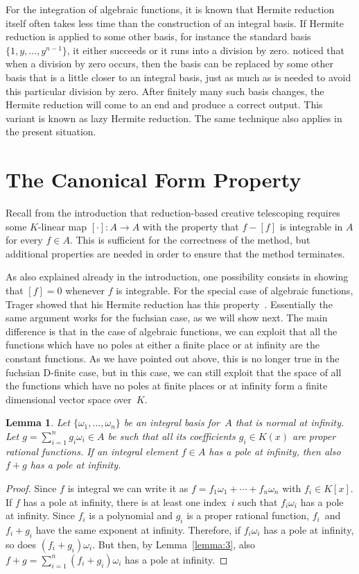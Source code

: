 \documentclass[final,1p,times,authoryear]{elsarticle}
\newtheorem{lemma}[theorem]{Lemma}
\begin{document}
For the integration of algebraic functions, it is known that Hermite reduction itself often
takes less time than the construction of an integral basis. If Hermite reduction is applied to some
other basis, for instance the standard basis $\{1,y,\dots,y^{n-1}\}$, it
either succeeds or it runs into a division by zero.
\cite{bronstein98a} noticed that when a division by zero occurs,
then the basis can be replaced by some other basis that is a little closer to
an integral basis, just as much as is needed to avoid this particular division
by zero. After finitely many such basis changes, the Hermite reduction will
come to an end and produce a correct output. This variant is known as lazy
Hermite reduction. The same technique also applies in the present situation.

\section{The Canonical Form Property}\label{sec:canonic}

Recall from the introduction that reduction-based creative telescoping requires
some $K$-linear map $[\cdot]\colon A\to A$ with the property that
$f-[f]$ is integrable in $A$ for every $f\in A$. This is sufficient for the
correctness of the method, but additional properties are needed in order to
ensure that the method terminates.

As also explained already in the introduction, one possibility consists in
showing that $[f]=0$ whenever $f$ is integrable. For the special case of
algebraic functions, Trager showed that his Hermite reduction has this
property~\citep[p.~50, Thm.~1]{trager84}. Essentially the same argument
works for the fuchsian case, as we will show next. The main difference is
that in the case of algebraic functions, we can exploit that all the functions
which have no poles at either a finite place or at infinity are the constant
functions. As we have pointed out above, this is no longer true in the fuchsian
D-finite case, but in this case, we can still exploit that the space of all
the functions which have no poles at finite places or at infinity form a finite
dimensional vector space over~$K$.

\begin{lemma}\label{lemma:pole_at_inf}
Let $\{\omega_1,\dots,\omega_n\}$ be an integral basis for~$A$ that is normal at
infinity. Let $g=\sum_{i=1}^ng_i\omega_i\in A$ be such that all its
coefficients $g_i\in K(x)$ are proper rational functions. If an integral
element $f\in A$ has a pole at infinity, then also $f+g$ has a pole at
infinity.
\end{lemma}
\begin{proof}
Since $f$ is integral we can write it as
$f=f_1\omega_1+\cdots+f_n\omega_n$ with $f_i\in K[x]$.
If $f$ has a pole at infinity, there is at least one index~$i$
such that $f_i\omega_i$ has a pole at infinity.
Since $f_i$ is a polynomial and $g_i$ is a proper rational function,
$f_i$~and $f_i+g_i$ have the same exponent at infinity.
Therefore, if $f_i\omega_i$ has a pole at infinity, so does $(f_i+g_i)\omega_i$.
But then, by Lemma~\ref{lemma:3}, also $f+g=\sum_{i=1}^n(f_i+g_i)\omega_i$ has
a pole at infinity.
\end{proof}
\end{document}
